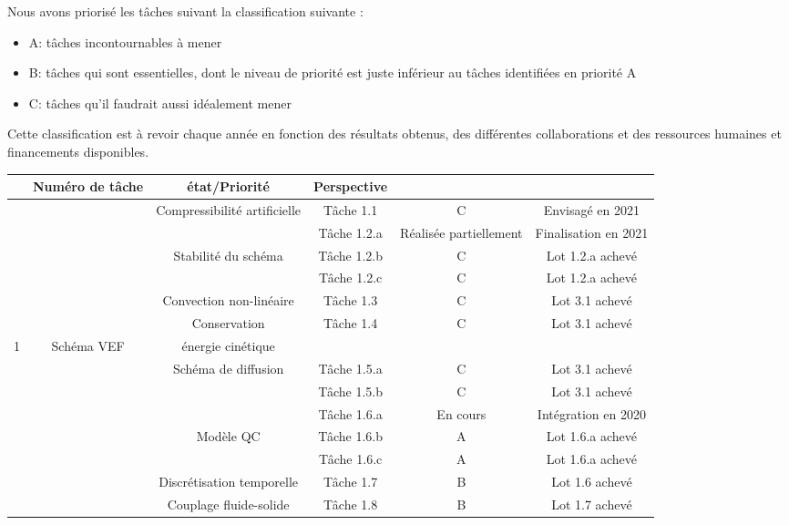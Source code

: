 Nous avons prioris\'e les t\^aches suivant la classification suivante :
\begin{itemize}
 \item A: t\^aches incontournables \`a mener
 \item B: t\^aches qui sont essentielles, dont le niveau de priorit\'e est juste inf\'erieur au t\^aches identifi\'ees en priorit\'e A
 \item C: t\^aches qu'il faudrait aussi id\'ealement mener
\end{itemize}

Cette classification est \`a revoir chaque ann\'ee en fonction des r\'esultats obtenus, des diff\'erentes collaborations et des ressources humaines et financements disponibles. 

\begin{center}
\begin{longtable}{|c|c|c|c|c|c|} 
\hline
\rowcolor{almond} \multicolumn{3}{|c|}{Lot} & Num\'ero de  t\^ache & \'etat/Priorit\'e & Perspective\\
\hline  
 &  & Compressibilit\'e artificielle & T\^ache 1.1  & C & Envisag\'e en 2021 \\
\cline{3-6}
& &  & T\^ache 1.2.a & R\'ealis\'ee partiellement & Finalisation en 2021\\
\cline{4-6}
& & Stabilit\'e du sch\'ema & T\^ache 1.2.b & C & Lot 1.2.a achev\'e\\
\cline{4-6}
& &  & T\^ache 1.2.c & C & Lot 1.2.a achev\'e\\
\cline{3-6}
& & Convection non-lin\'eaire & T\^ache 1.3 & C  & Lot 3.1 achev\'e\\
\cline{3-6}
& & Conservation & T\^ache 1.4 & C  & Lot 3.1 achev\'e \\
1& Sch\'ema VEF & \'energie cin\'etique &  &   & \\
\cline{3-6}
& & Sch\'ema de diffusion & T\^ache 1.5.a & C  & Lot 3.1 achev\'e\\
\cline{4-6}
& &  & T\^ache 1.5.b & C  & Lot 3.1 achev\'e\\
\cline{3-6}
& & & T\^ache 1.6.a & En cours  & Int\'egration en 2020\\
\cline{4-6}
& & Mod\`ele QC  & T\^ache 1.6.b & A  &  Lot 1.6.a achev\'e\\
\cline{4-6}
& &  & T\^ache 1.6.c & A  & Lot 1.6.a  achev\'e\\
\cline{3-6}
& & Discr\'etisation temporelle & T\^ache 1.7 & B & Lot 1.6 achev\'e\\
\cline{3-6}
& & Couplage fluide-solide & T\^ache 1.8 & B & Lot 1.7 achev\'e\\

\end{longtable}
\end{center}
